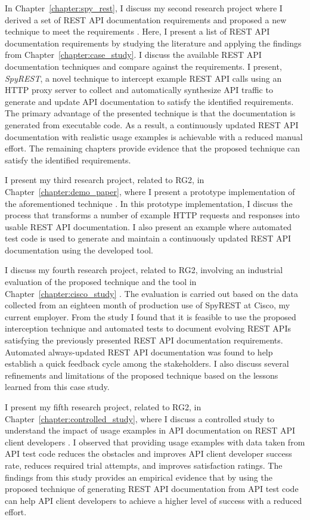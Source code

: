 In Chapter~\ref{chapter:spy_rest}, I discuss my second research project where I derived a set of REST API documentation requirements and proposed a new technique to meet the requirements \cite{sohan2015spyrest}. Here, I present a list of REST API documentation requirements by studying the literature and applying the findings from Chapter~\ref{chapter:case_study}. I discuss the available REST API documentation techniques and compare against the requirements. I present, \textit{SpyREST}, a novel technique to intercept example REST API calls using an HTTP proxy server to collect and automatically synthesize API traffic to generate and update API documentation to satisfy the identified requirements. The primary advantage of the presented technique is that the documentation is generated from executable code. As a result, a continuously updated REST API documentation with realistic usage examples is achievable with a reduced manual effort. The remaining chapters provide evidence that the proposed technique can satisfy the identified requirements.

I present my third research project, related to RG2, in Chapter~\ref{chapter:demo_paper}, where I present a prototype implementation of the aforementioned technique \cite{sohan2015spyrest_tool}. In this prototype implementation, I discuss the process that transforms a number of example HTTP requests and responses into usable REST API documentation. I also present an example where automated test code is used to generate and maintain a continuously updated REST API documentation using the developed tool.

I discuss my fourth research project, related to RG2, involving an industrial evaluation of the proposed technique and the tool in Chapter~\ref{chapter:cisco_study} \cite{sohan_cisco}. The evaluation is carried out based on the data collected from an eighteen month of production use of SpyREST at Cisco, my current employer. From the study I found that it is feasible to use the proposed interception technique and automated tests to document evolving REST APIs satisfying the previously presented REST API documentation requirements. Automated always-updated REST API documentation was found to help establish a quick feedback cycle among the stakeholders. I also discuss several refinements and limitations of the proposed technique based on the lessons learned from this case study.

I present my fifth research project, related to RG2, in Chapter~\ref{chapter:controlled_study}, where I discuss a controlled study to understand the impact of usage examples in API documentation on REST API client developers \cite{sohan_vlhcc}. I observed that providing usage examples with data taken from API test code reduces the obstacles and improves API client developer success rate, reduces required trial attempts, and improves satisfaction ratings. The findings from this study provides an empirical evidence that by using the proposed technique of generating REST API documentation from API test code can help API client developers to achieve a higher level of success with a reduced effort.

